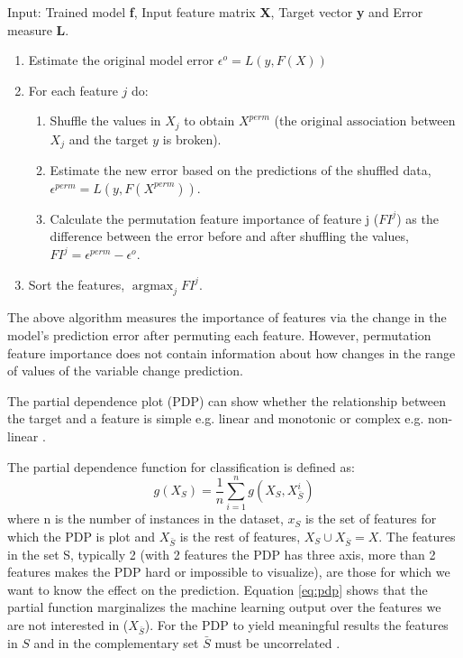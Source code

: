 \documentclass[preprint,12pt]{elsarticle}
\DeclareMathOperator*{\argmax}{argmax}
\newenvironment{steps}
 {\begin{enumerate}[label=Step \arabic*:,leftmargin=*,align=left]}
 {\end{enumerate}}
\newenvironment{substeps}
 {\begin{enumerate}[label=Step \arabic{enumi}.\alph*:,leftmargin=*,align=left]}
 {\end{enumerate}}
\begin{document}
\begin{center}\label{algo}
Input: Trained model \textbf{f}, Input feature matrix \textbf{X}, Target vector \textbf{y} and Error measure \textbf{L}.
\begin{steps}

  \item Estimate the original model error $ \epsilon^{o} = L(y, F(X))$
  \item For each feature $j$ do:
  \begin{substeps}
    \item Shuffle the values in $X_j$ to obtain $X^{perm}$ (the original association between $X_j$ and the target $y$ is broken). 
    \item Estimate the new error based on the predictions of the shuffled data, $\epsilon^{perm} = L(y, F(X^{perm}))$.
    \item Calculate the permutation feature importance of feature j ($FI^{j}$) as the difference between the error before and after shuffling the values, $FI^{j} = \epsilon^{perm} - \epsilon^{o}$.
    \end{substeps}
  \item Sort the features, $\argmax_{j} FI^{j}$.
\end{steps}
\end{center}

The above algorithm measures the importance of features via the change in the model’s prediction error after permuting each feature. However, permutation feature importance does not contain information about how changes in the range of values of the variable change prediction. 

The partial dependence plot (PDP) can show whether the relationship between the target and a feature is simple e.g. linear and monotonic or complex e.g. non-linear \cite{friedman2001greedy}.

The partial dependence function for classification is defined as:
\begin{equation}
g(X_S) = \frac{1}{n} \sum_{i=1}^{n} g(X_S,X_{\bar{S}}^i)
\label{eq:pdp}
\end{equation}
where n is the number of instances in the dataset, $x_S$ is the set of features for which the PDP is plot and $X_{\bar{S}}$ is the rest of features, $X_S \cup X_{\bar{S}} = X$. The features in the set S, typically 2 (with 2 features the PDP has three axis, more than 2 features makes the PDP hard or impossible to visualize), are those for which we want to know the effect on the prediction. Equation \ref{eq:pdp} shows that the partial function marginalizes the machine learning output over the features we are not interested in ($X_{\bar{S}}$). For the PDP to yield meaningful results the features in $S$ and in the complementary set $\bar{S}$ must be uncorrelated \cite{molnar2018interpretable}. 
\end{document}
